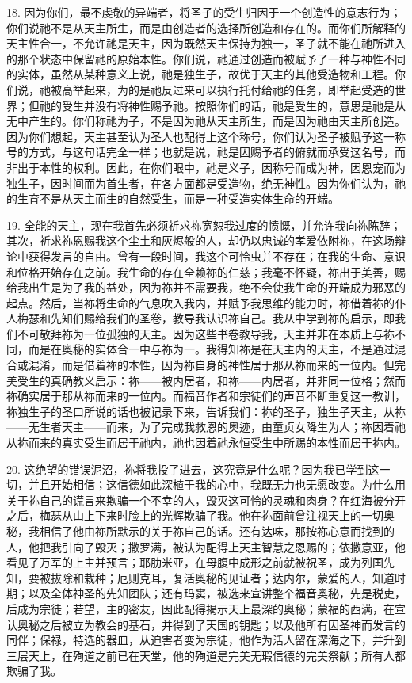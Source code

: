 18. 因为你们，最不虔敬的异端者，将圣子的受生归因于一个创造性的意志行为；你们说祂不是从天主所生，而是由创造者的选择所创造和存在的。而你们所解释的天主性合一，不允许祂是天主，因为既然天主保持为独一，圣子就不能在祂所进入的那个状态中保留祂的原始本性。你们说，祂通过创造而被赋予了一种与神性不同的实体，虽然从某种意义上说，祂是独生子，故优于天主的其他受造物和工程。你们说，祂被高举起来，为的是祂反过来可以执行托付给祂的任务，即举起受造的世界；但祂的受生并没有将神性赐予祂。按照你们的话，祂是受生的，意思是祂是从无中产生的。你们称祂为子，不是因为祂从天主所生，而是因为祂由天主所创造。因为你们想起，天主甚至认为圣人也配得上这个称号，你们认为圣子被赋予这一称号的方式，与这句话完全一样；也就是说，祂是因赐予者的俯就而承受这名号，而非出于本性的权利。因此，在你们眼中，祂是义子，因称号而成为神，因恩宠而为独生子，因时间而为首生者，在各方面都是受造物，绝无神性。因为你们认为，祂的生育不是从天主而生的自然受生，而是一种受造实体生命的开端。\par

19. 全能的天主，现在我首先必须祈求祢宽恕我过度的愤慨，并允许我向祢陈辞；其次，祈求祢恩赐我这个尘土和灰烬般的人，却仍以忠诚的孝爱依附祢，在这场辩论中获得发言的自由。曾有一段时间，我这个可怜虫并不存在；在我的生命、意识和位格开始存在之前。我生命的存在全赖祢的仁慈；我毫不怀疑，祢出于美善，赐给我出生是为了我的益处，因为祢并不需要我，绝不会使我生命的开端成为邪恶的起点。然后，当祢将生命的气息吹入我内，并赋予我思维的能力时，祢借着祢的仆人梅瑟和先知们赐给我们的圣卷，教导我认识祢自己。我从中学到祢的启示，即我们不可敬拜祢为一位孤独的天主。因为这些书卷教导我，天主并非在本质上与祢不同，而是在奥秘的实体合一中与祢为一。我得知祢是在天主内的天主，不是通过混合或混淆，而是借着祢的本性，因为祢自身的神性居于那从祢而来的一位内。但完美受生的真确教义启示：祢——被内居者，和祢——内居者，并非同一位格；然而祢确实居于那从祢而来的一位内。而福音作者和宗徒们的声音不断重复这一教训，祢独生子的圣口所说的话也被记录下来，告诉我们：祢的圣子，独生子天主，从祢——无生者天主——而来，为了完成我救恩的奥迹，由童贞女降生为人；祢因着祂从祢而来的真实受生而居于祂内，祂也因着祂永恒受生中所赐的本性而居于祢内。\par

20. 这绝望的错误泥沼，祢将我投了进去，这究竟是什么呢？因为我已学到这一切，并且开始相信；这信德如此深植于我的心中，我既无力也无愿改变。为什么用关于祢自己的谎言来欺骗一个不幸的人，毁灭这可怜的灵魂和肉身？在红海被分开之后，梅瑟从山上下来时脸上的光辉欺骗了我。他在祢面前曾注视天上的一切奥秘，我相信了他由祢所默示的关于祢自己的话。还有达味，那按祢心意而找到的人，他把我引向了毁灭；撒罗满，被认为配得上天主智慧之恩赐的；依撒意亚，他看见了万军的上主并预言；耶肋米亚，在母腹中成形之前就被祝圣，成为列国先知，要被拔除和栽种；厄则克耳，复活奥秘的见证者；达内尔，蒙爱的人，知道时期；以及全体神圣的先知团队；还有玛窦，被选来宣讲整个福音奥秘，先是税吏，后成为宗徒；若望，主的密友，因此配得揭示天上最深的奥秘；蒙福的西满，在宣认奥秘之后被立为教会的基石，并得到了天国的钥匙；以及他所有因圣神而发言的同伴；保禄，特选的器皿，从迫害者变为宗徒，他作为活人留在深海之下，并升到三层天上，在殉道之前已在天堂，他的殉道是完美无瑕信德的完美祭献；所有人都欺骗了我。\par

